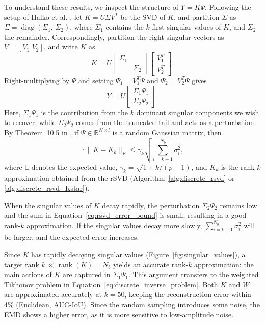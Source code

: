 To understand these results, we inspect the structure of $Y = K \Psi$. Following the setup of Halko et al. \cite[Sec.~9]{halkoFindingStructureRandomness2011}, let $K = U \Sigma V^T$ be the SVD of $K$, and partition $\Sigma$ as $\Sigma = \operatorname{diag}(\Sigma_1,\, \Sigma_2)$, where $\Sigma_1$ contains the $k$ first singular values of $K$, and $\Sigma_2$ the remainder. Correspondingly, partition the right singular vectors as $V = [V_1\,\, V_2]$, and write $K$ as
\begin{equation}\label{eq:rsvd_partitioned_1}
    K = U \begin{bmatrix}
    \Sigma_1 & \\ & \Sigma_2
    \end{bmatrix}
    \begin{bmatrix}
    V_1^T \\ V_2^T
    \end{bmatrix}.
\end{equation}
Right-multiplying by $\Psi$ and setting $\Psi_1 = V_1^T \Psi$ and $\Psi_2 = V_2^T \Psi$ gives
\begin{equation*}\label{eq:rsvd_partitioned_2}
    Y = U \begin{bmatrix}
    \Sigma_1 \Psi_1 \\
    \Sigma_2 \Psi_2
    \end{bmatrix}.
\end{equation*}
Here, $\Sigma_1 \Psi_1$ is the contribution from the $k$ dominant singular components we wish to recover, while $\Sigma_2 \Psi_2$ comes from the truncated tail and acts as a perturbation. By Theorem~10.5 in \cite{halkoFindingStructureRandomness2011}, if $\Psi \in \mathbb{R}^{N \times l}$ is a random Gaussian matrix, then
\begin{equation}\label{eq:rsvd_error_bound}
    \mathbb{E}\| K - K_k \|_F \le
    \gamma_k \sqrt{\sum_{i = k+1}^{N_b} \sigma_i^2},
\end{equation}
where $\mathbb{E}$ denotes the expected value, $\gamma_k = \sqrt{1 + k / (p - 1)}$, and $K_k$ is the rank-$k$ approximation obtained from the rSVD (Algorithm~\ref{alg:discrete_rsvd} or \ref{alg:discrete_rsvd_Kstar}).

When the singular values of $K$ decay rapidly, the perturbation $\Sigma_2 \Psi_2$ remains low and the sum in Equation~\eqref{eq:rsvd_error_bound} is small, resulting in a good rank-$k$ approximation. If the singular values decay more slowly, $\sum_{i=k+1}^{N_b} \sigma_i^2$ will be larger, and the expected error increases.

Since $K$ has rapidly decaying singular values
(Figure~\ref{fig:singular_values}), a target rank
$k \ll \operatorname{rank}(K) = N_b$ yields an accurate rank-$k$
approximation: the main actions of $K$ are captured in $\Sigma_1 \Psi_1$. This argument transfers to the weighted Tikhonov problem in Equation~\eqref{eq:discrete_inverse_problem}. Both $K$ and $W$ are approximated accurately at $k = 50$, keeping the reconstruction error within 4\% (Euclidean, AUC-IoU). Since the random sampling introduces some noise, the EMD shows a higher error, as it is more sensitive to low-amplitude noise.


